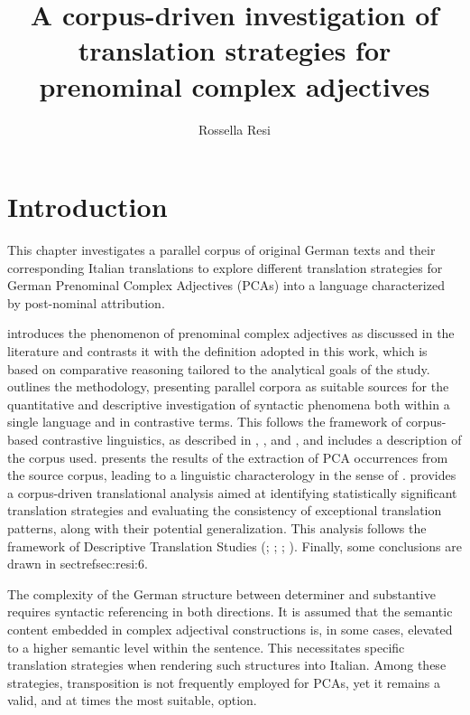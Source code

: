 \documentclass[output=paper,colorlinks,citecolor=brown]{langscibook}
\author{Rossella Resi\orcid{}\affiliation{Universität Innsbruck}}
\title[Translation strategies for prenominal complex adjectives]{A corpus-driven investigation of translation strategies for prenominal complex adjectives}
\begin{document}
\maketitle


\section{Introduction}\label{sec:resi:1}

This chapter investigates a parallel corpus of original German texts and their corresponding Italian translations to explore different translation strategies for German Prenominal Complex Adjectives (PCAs) into a language characterized by post-nominal attribution.

 introduces the phenomenon of prenominal complex adjectives as discussed in the literature and contrasts it with the definition adopted in this work, which is based on comparative reasoning tailored to the analytical goals of the study.  outlines the methodology, presenting parallel corpora as suitable sources for the quantitative and descriptive investigation of syntactic phenomena both within a single language and in contrastive terms. This follows the framework of corpus-based contrastive linguistics, as described in \citet{Laviosa1998,Laviosa2003}, \citet{EbelingHasselgard2018}, and \citet{Johansson1997,Johansson2003,Johansson2011}, and includes a description of the corpus used.  presents the results of the extraction of PCA occurrences from the source corpus, leading to a linguistic characterology in the sense of \citet{Mathesius1975}.  provides a corpus-driven translational analysis aimed at identifying statistically significant translation strategies and evaluating the consistency of exceptional translation patterns, along with their potential generalization. This analysis follows the framework of Descriptive Translation Studies (\citealt{Baker1993}; \citealt{Toury1991a,Toury1991b}; \citealt{Tognini-Bonelli2000,Tognini-Bonelli2001}; \citealt{Laviosa2002}). Finally, some conclusions are drawn in sectref{sec:resi:6}.

The complexity of the German structure between determiner and substantive requires syntactic referencing in both directions. It is assumed that the semantic content embedded in complex adjectival constructions is, in some cases, elevated to a higher semantic level within the sentence. This necessitates specific translation strategies when rendering such structures into Italian. Among these strategies, transposition is not frequently employed for PCAs, yet it remains a valid, and at times the most suitable, option.
\end{document}
